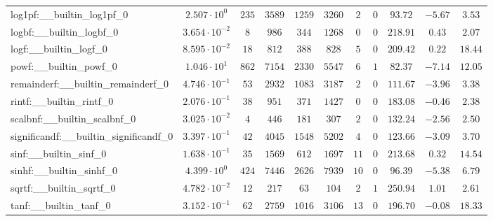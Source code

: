 \begin{tabular}{|l|c|c|c|c|c|c|c|c|c|c|}
log1pf:\_\_builtin\_log1pf\_0             & $ 2.507 \cdot 10^{0}  $ & $ 235    $ & $ 3589   $ & $ 1259  $ & $ 3260   $ & $ 2   $ & $ 0 $ & $ 93.72       $ & $ -5.67   $ & $ 3.53    $ \\
logbf:\_\_builtin\_logbf\_0               & $ 3.654 \cdot 10^{-2} $ & $ 8      $ & $ 986    $ & $ 344   $ & $ 1268   $ & $ 0   $ & $ 0 $ & $ 218.91      $ & $ 0.43    $ & $ 2.07    $ \\
logf:\_\_builtin\_logf\_0                 & $ 8.595 \cdot 10^{-2} $ & $ 18     $ & $ 812    $ & $ 388   $ & $ 828    $ & $ 5   $ & $ 0 $ & $ 209.42      $ & $ 0.22    $ & $ 18.44   $ \\
powf:\_\_builtin\_powf\_0                 & $ 1.046 \cdot 10^{1}  $ & $ 862    $ & $ 7154   $ & $ 2330  $ & $ 5547   $ & $ 6   $ & $ 1 $ & $ 82.37       $ & $ -7.14   $ & $ 12.05   $ \\
remainderf:\_\_builtin\_remainderf\_0     & $ 4.746 \cdot 10^{-1} $ & $ 53     $ & $ 2932   $ & $ 1083  $ & $ 3187   $ & $ 2   $ & $ 0 $ & $ 111.67      $ & $ -3.96   $ & $ 3.38    $ \\
rintf:\_\_builtin\_rintf\_0               & $ 2.076 \cdot 10^{-1} $ & $ 38     $ & $ 951    $ & $ 371   $ & $ 1427   $ & $ 0   $ & $ 0 $ & $ 183.08      $ & $ -0.46   $ & $ 2.38    $ \\
scalbnf:\_\_builtin\_scalbnf\_0           & $ 3.025 \cdot 10^{-2} $ & $ 4      $ & $ 446    $ & $ 181   $ & $ 307    $ & $ 2   $ & $ 0 $ & $ 132.24      $ & $ -2.56   $ & $ 2.50    $ \\
significandf:\_\_builtin\_significandf\_0 & $ 3.397 \cdot 10^{-1} $ & $ 42     $ & $ 4045   $ & $ 1548  $ & $ 5202   $ & $ 4   $ & $ 0 $ & $ 123.66      $ & $ -3.09   $ & $ 3.70    $ \\
sinf:\_\_builtin\_sinf\_0                 & $ 1.638 \cdot 10^{-1} $ & $ 35     $ & $ 1569   $ & $ 612   $ & $ 1697   $ & $ 11  $ & $ 0 $ & $ 213.68      $ & $ 0.32    $ & $ 14.54   $ \\
sinhf:\_\_builtin\_sinhf\_0               & $ 4.399 \cdot 10^{0}  $ & $ 424    $ & $ 7446   $ & $ 2626  $ & $ 7939   $ & $ 10  $ & $ 0 $ & $ 96.39       $ & $ -5.38   $ & $ 6.79    $ \\
sqrtf:\_\_builtin\_sqrtf\_0               & $ 4.782 \cdot 10^{-2} $ & $ 12     $ & $ 217    $ & $ 63    $ & $ 104    $ & $ 2   $ & $ 1 $ & $ 250.94      $ & $ 1.01    $ & $ 2.61    $ \\
tanf:\_\_builtin\_tanf\_0                 & $ 3.152 \cdot 10^{-1} $ & $ 62     $ & $ 2759   $ & $ 1016  $ & $ 3106   $ & $ 13  $ & $ 0 $ & $ 196.70      $ & $ -0.08   $ & $ 18.33   $ \\

\end{tabular}
